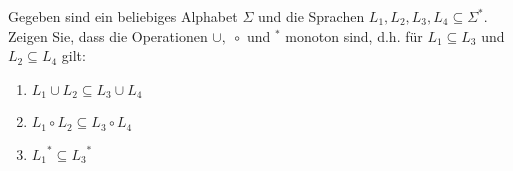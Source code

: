 
\begin{exercise}
Gegeben sind ein beliebiges Alphabet $\Sigma$ und die Sprachen $L_1,L_2,L_3,L_4\subseteq \Sigma^*$.
Zeigen Sie, dass die Operationen $\cup ,\;\circ$ und $^*$ monoton sind, 
d.h. für $L_1\subseteq L_3$ und $L_2\subseteq L_4$ gilt:
\begin{enumerate}
	\item $L_1\cup L_2\subseteq L_3 \cup L_4$
	\item $L_1\circ L_2\subseteq L_3 \circ L_4$
	\item ${L_1}^*\subseteq {L_3}^*$
\end{enumerate}
\end{exercise}
